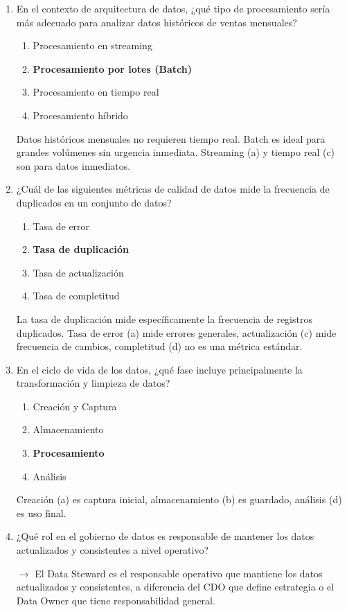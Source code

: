 \documentclass[12pt]{article}
\begin{document}
\begin{enumerate}[label=\arabic*.]
\item En el contexto de arquitectura de datos, ¿qué tipo de procesamiento sería más adecuado para analizar datos históricos de ventas mensuales?
\begin{enumerate}
    \item Procesamiento en streaming
    \item \textbf{Procesamiento por lotes (Batch)}
    \item Procesamiento en tiempo real
    \item Procesamiento híbrido
\end{enumerate}
Datos históricos mensuales no requieren tiempo real. Batch es ideal para grandes volúmenes sin urgencia inmediata. Streaming (a) y tiempo real (c) son para datos inmediatos.

\item ¿Cuál de las siguientes métricas de calidad de datos mide la frecuencia de duplicados en un conjunto de datos?
\begin{enumerate}
    \item Tasa de error
    \item \textbf{Tasa de duplicación}
    \item Tasa de actualización
    \item Tasa de completitud
\end{enumerate}
La tasa de duplicación mide específicamente la frecuencia de registros duplicados. Tasa de error (a) mide errores generales, actualización (c) mide frecuencia de cambios, completitud (d) no es una métrica estándar.

\item En el ciclo de vida de los datos, ¿qué fase incluye principalmente la transformación y limpieza de datos?
\begin{enumerate}
    \item Creación y Captura
    \item Almacenamiento
    \item \textbf{Procesamiento}
    \item Análisis
\end{enumerate}
Creación (a) es captura inicial, almacenamiento (b) es guardado, análisis (d) es uso final.

\item ¿Qué rol en el gobierno de datos es responsable de mantener los datos actualizados y consistentes a nivel operativo?

$\rightarrow$ El Data Steward es el responsable operativo que mantiene los datos actualizados y consistentes, a diferencia del CDO que define estrategia o el Data Owner que tiene responsabilidad general.


\end{enumerate}
\end{document}
